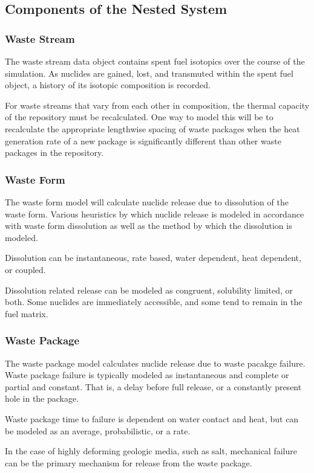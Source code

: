 \subsection{Components of the Nested System}
\subsubsection{Waste Stream}
The waste stream data object contains spent fuel isotopics over the 
course of the simulation. As nuclides are gained, lost, and transmuted within 
the spent fuel object, a history of its isotopic composition is recorded.

For waste streams that vary from each other in composition, the thermal capacity 
of the repository must be recalculated. One way to model this will be to 
recalculate the appropriate lengthwise spacing of waste packages when the heat 
generation rate of a new package is significantly different than other waste 
packages in the repository. 

\subsubsection{Waste Form}
The waste form model will calculate nuclide release due to dissolution 
of the waste form. Various heuristics by which nuclide release is modeled in 
accordance with waste form dissolution as well as the method by which 
the dissolution is modeled.

Dissolution can be instantaneous, rate based, water dependent, heat 
dependent, or coupled.

Dissolution related release can be modeled as congruent, solubility 
limited, or both. Some nuclides are immediately accessible, and some 
tend to remain in the fuel matrix. 

\subsubsection{Waste Package}
The waste package model calculates nuclide release due to waste 
pacakge failure. Waste package failure is typically modeled as 
instantaneous and complete or partial and constant. That is, a delay 
before full release, or a constantly present hole in the package.

Waste package time to failure is dependent on water contact and heat, 
but can be modeled as an average, probabilistic, or a rate.

In the case of highly deforming geologic media, such as salt, 
mechanical failure can be the primary mechanism for release from the 
waste package.

